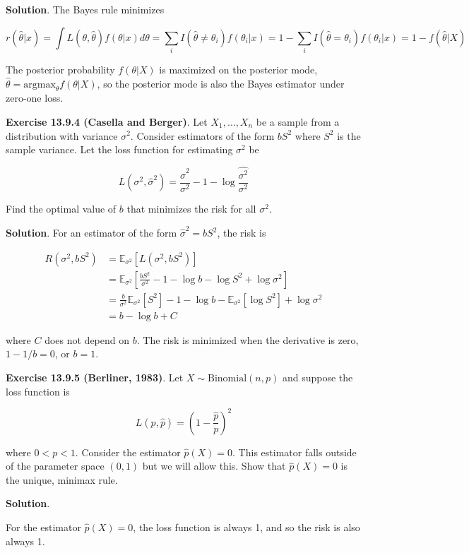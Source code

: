 \textbf{Solution}. The Bayes rule minimizes

\[r(\hat{\theta} | x) = \int L(\theta, \hat{\theta}) f(\theta | x) d\theta = \sum_i I(\hat{\theta} \neq \theta_i) f(\theta_i | x) = 1 - \sum_i I(\hat{\theta} = \theta_i) f(\theta_i | x) = 1 - f(\hat{\theta} | X)\]

The posterior probability \(f(\theta | X)\) is maximized on the
posterior mode, \(\hat{\theta} = \text{argmax}_\theta f(\theta | X)\),
so the posterior mode is also the Bayes estimator under zero-one loss.

\textbf{Exercise 13.9.4 (Casella and Berger)}. Let \(X_1, \dots, X_n\)
be a sample from a distribution with variance \(\sigma^2\). Consider
estimators of the form \(bS^2\) where \(S^2\) is the sample variance.
Let the loss function for estimating \(\sigma^2\) be

\[L(\sigma^2, \hat{\sigma}^2) = \frac{\hat{\sigma}^2}{\sigma^2} - 1 - \log \frac{\hat{\sigma^2}}{\sigma^2}\]

Find the optimal value of \(b\) that minimizes the risk for all
\(\sigma^2\).

\textbf{Solution}. For an estimator of the form
\(\hat{\sigma}^2 = bS^2\), the risk is

\begin{align}
R(\sigma^2, bS^2) &= \mathbb{E}_{\sigma^2}[ L(\sigma^2, bS^2) ]\\
&=\mathbb{E}_{\sigma^2}\left[\frac{bS^2}{\sigma^2} - 1 - \log b - \log S^2 + \log \sigma^2 \right] \\
&= \frac{b}{\sigma^2} \mathbb{E}_{\sigma^2}[S^2] - 1 -\log b - \mathbb{E}_{\sigma^2}[\log S^2] + \log \sigma^2 \\
&= b - \log b + C
\end{align}

where \(C\) does not depend on \(b\). The risk is minimized when the
derivative is zero, \(1 - 1/b = 0\), or \(b = 1\).

\textbf{Exercise 13.9.5 (Berliner, 1983)}. Let
\(X \sim \text{Binomial}(n, p)\) and suppose the loss function is

\[ L(p, \hat{p}) = \left(1 - \frac{\hat{p}}{p} \right)^2\]

where \(0 < p < 1\). Consider the estimator \(\hat{p}(X) = 0\). This
estimator falls outside of the parameter space \((0, 1)\) but we will
allow this. Show that \(\hat{p}(X) = 0\) is the unique, minimax rule.

\textbf{Solution}.

For the estimator \(\hat{p}(X) = 0\), the loss function is always 1, and
so the risk is also always 1.

